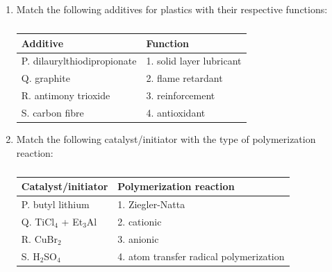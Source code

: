 \documentclass[a4paper,10pt]{article}
\begin{document}
\begin{enumerate}
    \item Match the following additives for plastics with their respective functions:
    \begin{table}[h!] \centering \caption*{} \label{tab:q18_polymer}
        \begin{tabular}{ll} \hline
            \textbf{Additive} & \textbf{Function} \\ \hline
            P. dilaurylthiodipropionate & 1. solid layer lubricant \\
            Q. graphite & 2. flame retardant \\
            R. antimony trioxide & 3. reinforcement \\
            S. carbon fibre & 4. antioxidant \\ \hline
        \end{tabular}
    \end{table}
    
    \hfill{}
    \begin{enumerate}
    \end{enumerate}
    
    \item Match the following catalyst/initiator with the type of polymerization reaction:
    \begin{table}[h!] \centering \caption*{} \label{tab:q19_polymer}
        \begin{tabular}{ll} \hline
            \textbf{Catalyst/initiator} & \textbf{Polymerization reaction} \\ \hline
            P. butyl lithium & 1. Ziegler-Natta \\
            Q. TiCl$_4$ + Et$_3$Al & 2. cationic \\
            R. CuBr$_2$ & 3. anionic \\
            S. H$_2$SO$_4$ & 4. atom transfer radical polymerization \\ \hline
        \end{tabular}
    \end{table}
    
    \hfill{}
    \begin{enumerate}
    \end{enumerate}
    

\end{enumerate}
\end{document}
